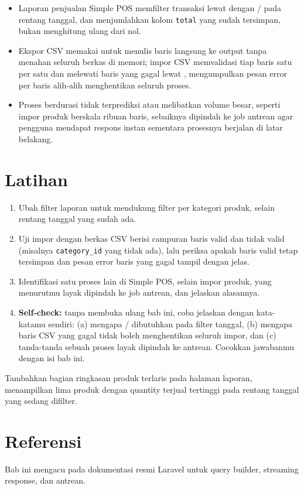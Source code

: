 \begin{itemize}
  \item Laporan penjualan Simple POS memfilter transaksi lewat
     dengan /
    pada rentang tanggal, dan menjumlahkan kolom \texttt{total} yang
    sudah tersimpan, bukan menghitung ulang dari nol.
  \item Ekspor CSV memakai  untuk menulis
    baris langsung ke output tanpa menahan seluruh berkas di memori;
    impor CSV memvalidasi tiap baris satu per satu dan melewati baris
    yang gagal lewat , mengumpulkan pesan error per
    baris alih-alih menghentikan seluruh proses.
  \item Proses berdurasi tidak terprediksi atau melibatkan volume besar,
    seperti impor produk berskala ribuan baris, sebaiknya dipindah ke
    job antrean agar pengguna mendapat respons instan sementara
    prosesnya berjalan di latar belakang.
\end{itemize}

\section{Latihan}

\begin{enumerate}
  \item Ubah filter laporan untuk mendukung filter per kategori produk,
    selain rentang tanggal yang sudah ada.
  \item Uji impor dengan berkas CSV berisi campuran baris valid dan
    tidak valid (misalnya \texttt{category\_id} yang tidak ada), lalu
    periksa apakah baris valid tetap tersimpan dan pesan error baris
    yang gagal tampil dengan jelas.
  \item Identifikasi satu proses lain di Simple POS, selain impor
    produk, yang menurutmu layak dipindah ke job antrean, dan jelaskan
    alasannya.
  \item \textbf{Self-check:} tanpa membuka ulang bab ini, coba jelaskan
    dengan kata-katamu sendiri: (a) mengapa /
    dibutuhkan pada filter tanggal, (b) mengapa baris CSV yang gagal
    tidak boleh menghentikan seluruh impor, dan (c) tanda-tanda sebuah
    proses layak dipindah ke antrean. Cocokkan jawabanmu dengan isi bab
    ini.
\end{enumerate}

\begin{challengebox}
Tambahkan bagian ringkasan produk terlaris pada halaman laporan,
menampilkan lima produk dengan quantity terjual tertinggi pada rentang
tanggal yang sedang difilter.
\end{challengebox}

\section{Referensi}

Bab ini mengacu pada dokumentasi resmi Laravel \cite{laraveldocs} untuk
query builder, streaming response, dan antrean.
